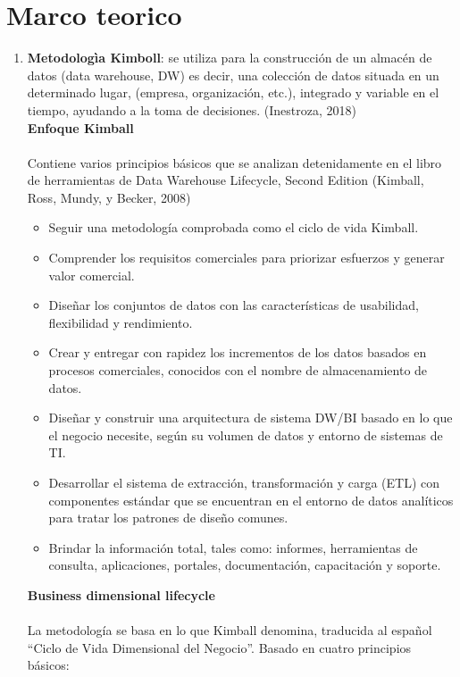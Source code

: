 \documentclass[twoside,twocolumn]{article}
\begin{document}
\section{Marco teorico}
\begin{enumerate}
\item \textbf{Metodologìa Kimboll}: se utiliza para la construcción de un almacén de datos (data warehouse, DW) es decir, una colección de datos situada en un determinado lugar, (empresa, organización, etc.), integrado y variable en el tiempo, ayudando a la toma de decisiones. (Inestroza, 2018) \\

\textbf{Enfoque Kimball}
\\ \\
Contiene varios principios básicos que se analizan detenidamente en el libro de herramientas de Data Warehouse Lifecycle, Second Edition (Kimball, Ross, Mundy, y Becker, 2008)
\begin{itemize}
\item Seguir una metodología comprobada como el  ciclo de vida Kimball.
\item Comprender los requisitos comerciales para priorizar esfuerzos y generar valor comercial. 
\item Diseñar los conjuntos de datos con las características de usabilidad, flexibilidad y rendimiento.
\item Crear y entregar con rapidez los incrementos de los datos basados en procesos comerciales, conocidos con el nombre de almacenamiento de datos. 
\item Diseñar y construir una arquitectura de sistema DW/BI basado en lo que el negocio necesite, según su volumen de datos y entorno de sistemas de TI. 
\item Desarrollar el sistema de extracción, transformación y carga (ETL) con componentes estándar que se encuentran en el entorno de datos analíticos para tratar los patrones de diseño comunes.
\item Brindar la información total, tales como: informes, herramientas de consulta, aplicaciones, portales, documentación, capacitación y soporte.
\end{itemize}



\textbf{Business dimensional lifecycle}
\\ \\
La metodología se basa en lo que Kimball denomina, traducida al español “Ciclo de Vida Dimensional del Negocio”. Basado en cuatro principios básicos:


\end{enumerate}
\end{document}
